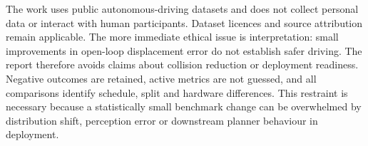 The work uses public autonomous-driving datasets and does not collect personal data or interact with human participants. Dataset licences and source attribution remain applicable. The more immediate ethical issue is interpretation: small improvements in open-loop displacement error do not establish safer driving. The report therefore avoids claims about collision reduction or deployment readiness. Negative outcomes are retained, active metrics are not guessed, and all comparisons identify schedule, split and hardware differences. This restraint is necessary because a statistically small benchmark change can be overwhelmed by distribution shift, perception error or downstream planner behaviour in deployment.

